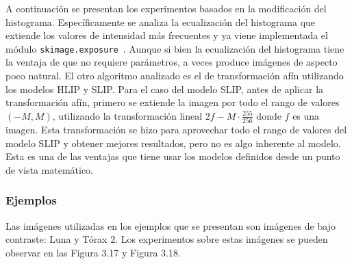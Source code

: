 A continuaci\'on se presentan los experimentos basados en la modificaci\'on del histograma. Espec\'ificamente se analiza la ecualizaci\'on del histograma que extiende los valores de intensidad más frecuentes y ya viene implementada el m\'odulo \verb|skimage.exposure|~\cite{histogram_equalization}. Aunque si bien la ecualización del histograma tiene la ventaja de que no requiere parámetros, a veces produce imágenes de aspecto poco natural. El otro algoritmo analizado es el de transformaci\'on af\'in utilizando los modelos HLIP y SLIP. Para el caso del modelo SLIP, antes de aplicar la transformaci\'on af\'in, primero se extiende la imagen por todo el rango de valores $(-M,M)$, utilizando la transformaci\'on lineal $2f-M\cdot\frac{255}{256}$ donde $f$ es una imagen. Esta transformaci\'on se hizo para aprovechar todo el rango de valores del modelo SLIP y obtener mejores resultados, pero no es algo inherente al modelo. Esta es una de las ventajas que tiene usar los modelos definidos desde un punto de vista matem\'atico. 

\subsubsection{Ejemplos}

Las im\'agenes utilizadas en los ejemplos que se presentan son im\'agenes de bajo contraste: Luna y T\'orax 2. Los experimentos sobre estas im\'agenes se pueden observar en las Figura 3.17 y Figura 3.18.

